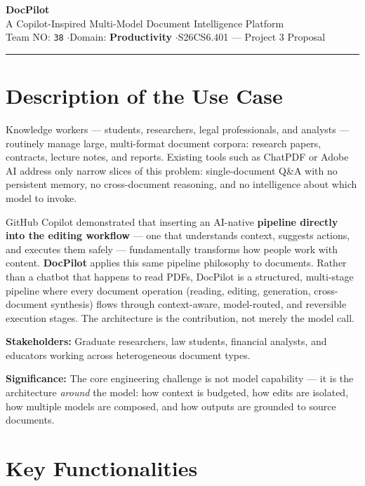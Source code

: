 \documentclass[10pt]{article}
\begin{document}
\begin{center}
  {\Large\bfseries DocPilot}\\[3pt]
  {\normalsize A Copilot-Inspired Multi-Model Document Intelligence Platform}\\[5pt]
  {\small Team NO: \texttt{38} \quad$\cdot$\quad Domain: \textbf{Productivity} \quad$\cdot$\quad S26CS6.401 --- Project 3 Proposal}
\end{center}
\noindent\rule{\linewidth}{0.8pt}\vspace{1pt}

\section{Description of the Use Case}

Knowledge workers --- students, researchers, legal professionals, and analysts --- routinely manage large, multi-format document corpora: research papers, contracts, lecture notes, and reports. Existing tools such as ChatPDF or Adobe AI address only narrow slices of this problem: single-document Q\&A with no persistent memory, no cross-document reasoning, and no intelligence about which model to invoke.

GitHub Copilot demonstrated that inserting an AI-native \textbf{pipeline directly into the editing workflow} --- one that understands context, suggests actions, and executes them safely --- fundamentally transforms how people work with content. \textbf{DocPilot} applies this same pipeline philosophy to documents. Rather than a chatbot that happens to read PDFs, DocPilot is a structured, multi-stage pipeline where every document operation (reading, editing, generation, cross-document synthesis) flows through context-aware, model-routed, and reversible execution stages. The architecture is the contribution, not merely the model call.

\textbf{Stakeholders:} Graduate researchers, law students, financial analysts, and educators working across heterogeneous document types.

\textbf{Significance:} The core engineering challenge is not model capability --- it is the architecture \textit{around} the model: how context is budgeted, how edits are isolated, how multiple models are composed, and how outputs are grounded to source documents.

\section{Key Functionalities}
\end{document}
